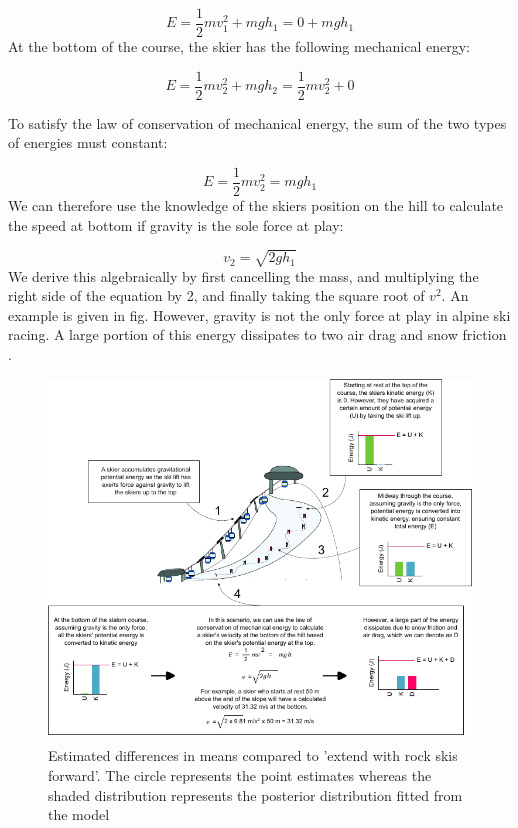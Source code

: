 \documentclass[letterpaper,10pt]{article}
\begin{document}
\[E = \frac{1}{2} m v^2_1 + mgh_1 = 0 + mgh_1\] 
At the bottom of the course, the skier has the following mechanical energy:


\[E = \frac{1}{2} m v^2_2 + mgh_2 = \frac{1}{2} m v^2_2 + 0\] 

To satisfy the law of conservation of mechanical energy, the sum of the two types of energies must constant:

\[E = \frac{1}{2} m v^2_2 = mgh_1\] 
We can therefore use the knowledge of the skiers position on the hill to calculate the speed at bottom if gravity is the sole force at play:

\[v_2 = \sqrt{2gh_1} \] 
We derive this algebraically by first cancelling the mass, and multiplying the right side of the equation by 2, and finally taking the square root of $v^2$. An example is given in fig. However, gravity is not the only force at play in alpine ski racing. A large portion of this energy dissipates to two air drag and snow friction \cite{supej_differential_2008}.


\begin{figure}[H]
\centering
\includegraphics{figure_energymechanics.pdf}
\caption{Estimated differences in means compared to 'extend with rock skis forward'. The circle represents the point estimates whereas the shaded distribution represents the posterior distribution fitted from the model}
\label{fig:energy}
\end{figure}
\end{document}
